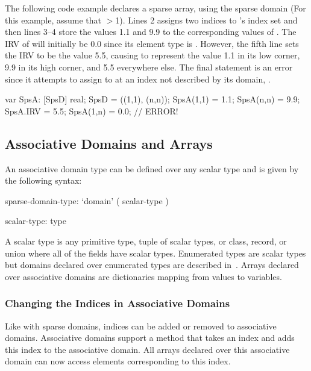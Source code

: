 \begin{example}
The following code example declares a sparse array,  using
the sparse domain  (For this example, assume that
$>$1).  Lines 2 assigns two indices to 's index set
and then lines 3--4 store the values 1.1 and 9.9 to the corresponding
values of .  The IRV of  will initially be 0.0
since its element type is .  However, the fifth line sets
the IRV to be the value 5.5, causing  to represent the
value 1.1 in its low corner, 9.9 in its high corner, and 5.5
everywhere else.  The final statement is an error since it attempts to
assign to  at an index not described by its domain,
.

\begin{chapel}
var SpsA: [SpsD] real;
SpsD = ((1,1), (n,n));
SpsA(1,1) = 1.1;
SpsA(n,n) = 9.9;
SpsA.IRV = 5.5;
SpsA(1,n) = 0.0;  // ERROR!
\end{chapel}
\end{example}



\subsection{Associative Domains and Arrays}
\label{Associative_Domains_and_Arrays}

An associative domain type can be defined over any scalar type and is
given by the following syntax:
\begin{syntax}
sparse-domain-type:
  `domain' ( scalar-type )

scalar-type:
  type
\end{syntax}
A scalar type is any primitive type, tuple of scalar types, or class,
record, or union where all of the fields have scalar types.
Enumerated types are scalar types but domains declared over enumerated
types are described in~.  Arrays
declared over associative domains are dictionaries mapping from values
to variables.

\subsubsection{Changing the Indices in Associative Domains}

Like with sparse domains, indices can be added or removed to
associative domains.  Associative domains support a method 
that takes an index and adds this index to the associative domain.  All
arrays declared over this associative domain can now access elements
corresponding to this index.

